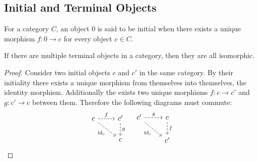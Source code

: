 \subsection{Initial and Terminal Objects}

\begin{definition}
  For a category $C$, an object $0$ is said to be initial when there exists a
  unique morphism $f: 0\to c$ for every object $c\in C$.
  \parencite{awodey:category_theory}
\end{definition}

\begin{theorem}\label{thm:initial_object_iso} If
  there are multiple terminal objects in a category, then they are all
  isomorphic.

  \begin{proof}
    Consider two initial objects $c$ and $c'$ in the same category. By their
    initiality there exists a unique morphism from themselves into themselves,
    the identity morphism. Additionally the exists two unique morphisms $f:c\to
    c'$ and $g:c' \to c$ between them. Therefore the following diagrams must
    commute:
    \[\begin{tikzcd}
      c & {c'} \\
      & c
      \arrow["{\id_c}"', dashed, from=1-1, to=2-2]
      \arrow["f", dashed, from=1-1, to=1-2]
      \arrow["g", dashed, from=1-2, to=2-2]
    \end{tikzcd}
    \quad
    \begin{tikzcd}
      {c'} & c \\
      & {c'}
      \arrow["{\id_c}"', dashed, from=1-1, to=2-2]
      \arrow["g", dashed, from=1-1, to=1-2]
      \arrow["f", dashed, from=1-2, to=2-2]
    \end{tikzcd}\]
  \end{proof}
\end{theorem}

